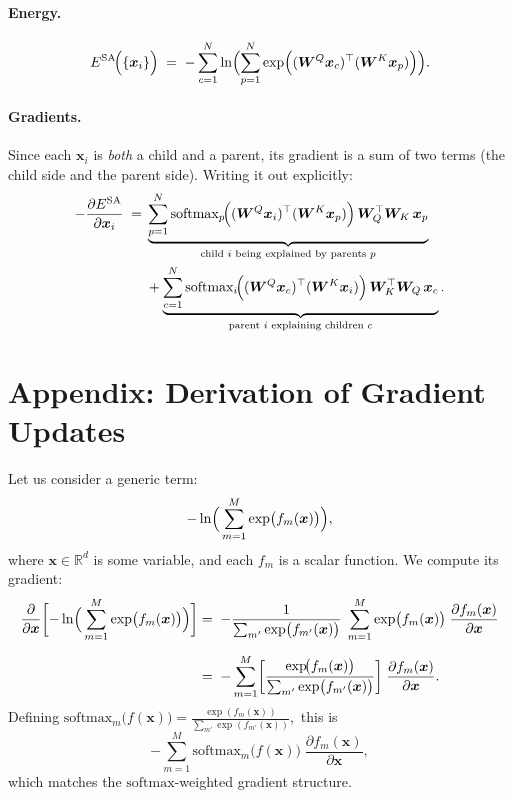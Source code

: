 \documentclass{article}
\begin{document}
\paragraph{Energy.}
\begin{equation}
E^{\mathrm{SA}}\!\Bigl(\{\bm{x}_i\}\Bigr)
\;=\;
-\sum_{c=1}^N
\ln \Bigl(\sum_{p=1}^N
\exp \Bigl(
(\bm{W}^Q \bm{x}_c)^\top
(\bm{W}^K \bm{x}_p)
\Bigr)\Bigr).
\end{equation}

\paragraph{Gradients.}
Since each \(\bm{x}_i\) is \emph{both} a child and a parent, its gradient is a sum of two terms (the child side and the parent side).  Writing it out explicitly:
\begin{equation}
    \begin{aligned}
    -\frac{\partial E^{\mathrm{SA}}}{\partial \bm{x}_i}
    \;=\;&
    \underbrace{
    \sum_{p=1}^N
    \text{softmax}_{p}\!\Bigl(
    (\bm{W}^Q \bm{x}_i)^\top
    (\bm{W}^K \bm{x}_p)
    \Bigr)\,
    \bm{W}_Q^\top \bm{W}_K \,\bm{x}_p
    }_{\text{child $i$ being explained by parents $p$}} \\
    &+
    \underbrace{
    \sum_{c=1}^N
    \text{softmax}_{i}\!\Bigl(
    (\bm{W}^Q \bm{x}_c)^\top
    (\bm{W}^K \bm{x}_i)
    \Bigr)\,
    \bm{W}_K^\top \bm{W}_Q \,\bm{x}_c
    }_{\text{parent $i$ explaining children $c$}}.
    \end{aligned}
    \end{equation}


\clearpage
\appendix

\section{Appendix: Derivation of Gradient Updates}

Let us consider a generic term:
\[
-\ln \Bigl(\,\sum_{m=1}^M \exp \bigl(f_m(\bm{x})\bigr)\Bigr),
\]
where \(\bm{x}\in \mathbb{R}^d\) is some variable, and each \(f_m\) is a scalar function.
We compute its gradient:
\begin{align*}
\frac{\partial}{\partial \bm{x}}
\biggl[
-\ln \Bigl(\,\sum_{m=1}^M \exp \bigl(f_m(\bm{x})\bigr)\Bigr)
\biggr]
&=\;
-\frac{1}{\sum_{m'} \exp \bigl(f_{m'}(\bm{x})\bigr)}
\;\sum_{m=1}^M
\exp \bigl(f_m(\bm{x})\bigr)\;\frac{\partial f_m(\bm{x})}{\partial \bm{x}}
\\[6pt]
&=\;
-\sum_{m=1}^M
\biggl[
\frac{\exp\!\bigl(f_m(\bm{x})\bigr)}{\sum_{m'} \exp \bigl(f_{m'}(\bm{x})\bigr)}
\biggr]
\;\frac{\partial f_m(\bm{x})}{\partial \bm{x}}.
\end{align*}
Defining
\(\mathrm{softmax}_m\bigl(f(\bm{x})\bigr) 
= 
\tfrac{\exp(f_m(\bm{x}))}{\sum_{m'} \exp(f_{m'}(\bm{x}))},\)
this is
\[
-\sum_{m=1}^M
\mathrm{softmax}_m \bigl(f(\bm{x})\bigr)
\;\frac{\partial f_m(\bm{x})}{\partial \bm{x}},
\]
which matches the \(\mathrm{softmax}\)-weighted gradient structure.
\end{document}
